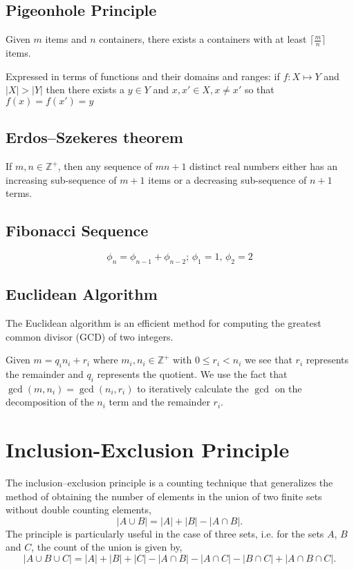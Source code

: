 \documentclass{article}
\begin{document}
\subsection{Pigeonhole Principle}
Given $m$ items and $n$ containers, there exists a containers with at least $\lceil \frac{m}{n} \rceil$ items.

Expressed in terms of functions and their domains and ranges: if $f: X \mapsto Y$ and $|X| > |Y|$ then there exists a $y \in Y$ and $x, x' \in X, x \neq x'$ so that $f(x) = f(x') = y$

\subsection{Erdos–Szekeres theorem}
If $m,n \in \mathbb Z^+$, then any sequence of $mn+1$ distinct real numbers either has an increasing sub-sequence of $m+1$ items or a decreasing sub-sequence of $n+1$ terms. 

\subsection{Fibonacci Sequence}
\[
\phi_n = \phi_{n-1} +\phi_{n-2}\text{; } \phi_1 = 1 \text{, } \phi_2 = 2
\]

\subsection{Euclidean Algorithm}
The Euclidean algorithm is an efficient method for computing the greatest common divisor (GCD) of two integers.

Given $m = q_i n_i + r_i$ where $m_i,n_i \in \mathbb Z^+$ with $0 \leq r_i < n_i$ we see that $r_i$ represents the remainder and $q_i$ represents the quotient. We use the fact that $\gcd(m, n_i) = \gcd(n_i, r_i)$ to iteratively calculate the $\gcd$ on the decomposition of the $n_i$ term and the remainder $r_i$.

\section{Inclusion-Exclusion Principle}
The inclusion–exclusion principle is a counting technique that generalizes the method of obtaining the number of elements in the union of two finite sets without double counting elements,
\[
    |A\cup B|=|A|+|B|-|A\cap B|.
\]
The principle is particularly useful in the case of three sets, i.e. for the sets $A$, $B$ and $C$, the count of the union is given by,
\[
|A\cup B\cup C|=|A|+|B|+|C|-|A\cap B|-|A\cap C|-|B\cap C|+|A\cap B\cap C|.
\]
\end{document}
